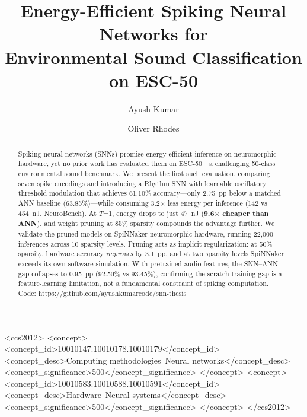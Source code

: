 \documentclass[sigconf,nonacm=false]{acmart}
\begin{document}
\title{Energy-Efficient Spiking Neural Networks for\\Environmental Sound Classification on ESC-50}

\author{Ayush Kumar}

\author{Oliver Rhodes}

\begin{abstract}
Spiking neural networks (SNNs) promise energy-efficient inference on neuromorphic hardware, yet no prior work has evaluated them on ESC-50---a challenging 50-class environmental sound benchmark.
We present the first such evaluation, comparing seven spike encodings and introducing a Rhythm SNN with learnable oscillatory threshold modulation that achieves 61.10\% accuracy---only 2.75~pp below a matched ANN baseline (63.85\%)---while consuming 3.2$\times$ less energy per inference (142 vs 454~nJ, NeuroBench).
At $T$=1, energy drops to just 47~nJ (\textbf{9.6$\times$ cheaper than ANN}), and weight pruning at 85\% sparsity compounds the advantage further.
We validate the pruned models on SpiNNaker neuromorphic hardware, running 22{,}000+ inferences across 10 sparsity levels.
Pruning acts as implicit regularization: at 50\% sparsity, hardware accuracy \emph{improves} by 3.1~pp, and at two sparsity levels SpiNNaker exceeds its own software simulation.
With pretrained audio features, the SNN--ANN gap collapses to 0.95~pp (92.50\% vs 93.45\%), confirming the scratch-training gap is a feature-learning limitation, not a fundamental constraint of spiking computation.
Code: \url{https://github.com/ayushkumarcode/snn-thesis}
\end{abstract}

\begin{CCSXML}
<ccs2012>
<concept>
<concept_id>10010147.10010178.10010179</concept_id>
<concept_desc>Computing methodologies~Neural networks</concept_desc>
<concept_significance>500</concept_significance>
</concept>
<concept>
<concept_id>10010583.10010588.10010591</concept_id>
<concept_desc>Hardware~Neural systems</concept_desc>
<concept_significance>500</concept_significance>
</concept>
</ccs2012>
\end{CCSXML}

\end{document}
